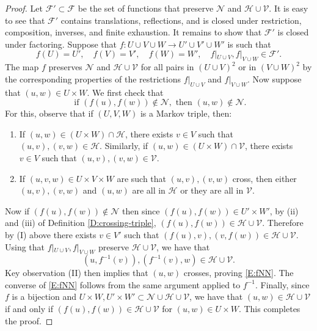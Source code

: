 \documentclass[aop, preprint]{imsart}
\theoremstyle{plain}
\theoremstyle{definition}
\theoremstyle{plain}
\newcommand{\sset}{\subset}
\newcommand{\scrV}{\mathcal{V}}
\newcommand{\scrH}{\mathcal{H}}
\newcommand{\scrN}{\mathcal{N}}
\newcommand{\scrF}{\mathcal{F}}
\newcommand{\X}{\times}
\begin{document}
\begin{proof}
	Let $\scrF' \sset \scrF$ be the set of functions that preserve $\scrN$ and $\scrH \cup \scrV$. It is easy to see that $\scrF'$ contains translations, reflections, and is closed under restriction, composition, inverses, and finite exhaustion. It remains to show that $\scrF'$ is closed under factoring. Suppose that $f: U \cup V \cup W \to U' \cup V' \cup W'$ is such that 
	$$
	f(U) = U', \quad f(V) = V', \quad f(W) = W', \quad f|_{U \cup V}, f|_{V \cup W} \in \scrF'.
	$$
	The map $f$ preserves $\scrN$ and $\scrH \cup \scrV$ for all pairs in $(U \cup V)^2$ or in $(V \cup W)^2$ by the corresponding properties of the restrictions $f|_{U \cup V}$ and $f|_{V \cup W}$. Now suppose that $(u, w) \in U \X W$. We first check that
	\begin{equation}
	\label{E:fNN}
	\text{ if } (f(u), f(w)) \notin \scrN, \text{ then } (u, w) \notin \scrN.
	\end{equation}
	For this, observe that if $(U, V, W)$ is a Markov triple, then:
	\begin{enumerate}[nosep,label=(\Roman*)]
		\item If $(u, w) \in (U \X W) \cap \scrH$, there exists $v \in V$ such that $(u, v), (v, w) \in \scrH$. Similarly, if $(u, w) \in (U \X W) \cap \scrV$, there exists $v \in V$ such that $(u, v), (v, w) \in \scrV$.
		\item If $(u, v, w) \in U \X V \X W$ are such that $(u, v), (v, w)$ cross, then either $(u, v), (v, w)$ and $(u, w)$ are all in $\scrH$ or they are all in $\scrV$.
	\end{enumerate} 
	Now if $(f(u), f(w)) \notin \scrN$ then since $(f(u), f(w)) \in U' \X W'$, by (ii) and (iii) of Definition \ref{D:crossing-triple}, $(f(u), f(w)) \in \scrH \cup \scrV$. Therefore by (I) above there exists $v \in V'$ such that $(f(u), v), (v, f(w)) \in \scrH \cup \scrV$. Using that $f|_{U \cup V},f|_{V \cup W}$ preserve $\scrH \cup \scrV$, we have that
	$$
	(u, f^{-1}(v)), (f^{-1}(v), w) \in \scrH \cup \scrV.
	$$
	Key observation (II) then implies that $(u, w)$ crosses, proving \eqref{E:fNN}. The converse of \eqref{E:fNN} follows from the same argument applied to $f^{-1}$. Finally, since $f$ is a bijection and $U \X W, U' \X W' \sset \scrN \cup \scrH \cup \scrV$, we have that $(u, w) \in \scrH \cup \scrV$ if and only if $(f(u), f(w)) \in \scrH \cup \scrV$ for $(u, w) \in U \X W$. This completes the proof. 
\end{proof}
\end{document}

